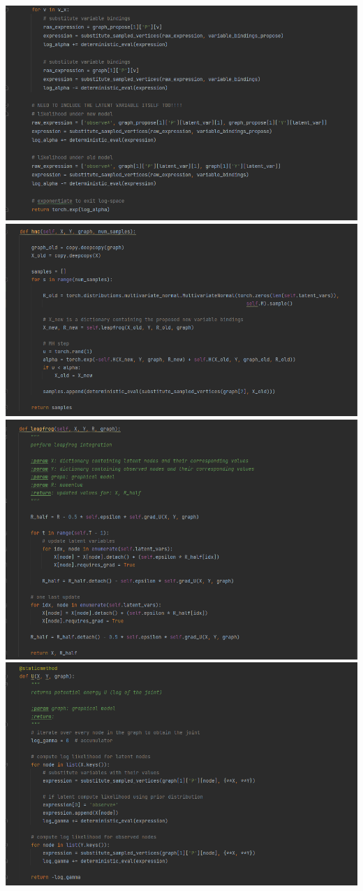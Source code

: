 \documentclass[10pt]{homeworg}
\begin{document}
\begin{center}
\includegraphics[scale=0.5]{code_snippets/accept(2).png}
\includegraphics[scale=0.5]{code_snippets/hmc.png}
\includegraphics[scale=0.5]{code_snippets/leapfrog.png}
\includegraphics[scale=0.5]{code_snippets/U.png}

\end{center}
\end{document}

